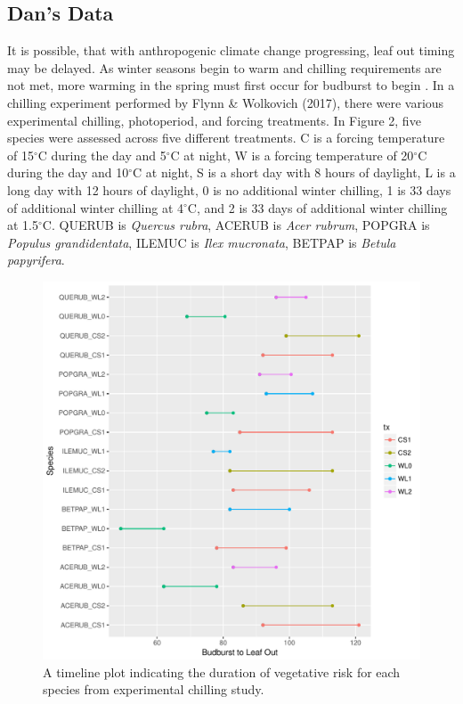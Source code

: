 \documentclass{article}\usepackage[]{graphicx}\usepackage[]{color}
\makeatletter
\def\maxwidth{ %
  \ifdim\Gin@nat@width>\linewidth
    \linewidth
  \else
    \Gin@nat@width
  \fi
}
\makeatother
\begin{document}
\subsection*{Dan's Data}
It is possible, that with anthropogenic climate change progressing, leaf out timing may be delayed. As winter seasons begin to warm and chilling requirements are not met, more warming in the spring must first occur for budburst to begin \citep{Chuine2010, Polgar2014, Fu2012, Morin2009, McCreary1990}. In a chilling experiment performed by Flynn \& Wolkovich (2017), there were various experimental chilling, photoperiod, and forcing treatments. In Figure 2, five species were assessed across five different treatments. C is a forcing temperature of 15$^{\circ}$C during the day and 5$^{\circ}$C at night, W is a forcing temperature of 20$^{\circ}$C during the day and 10$^{\circ}$C at night, S is a short day with 8 hours of daylight, L is a long day with 12 hours of daylight, 0 is no additional winter chilling, 1 is 33 days of additional winter chilling at 4$^{\circ}$C, and 2 is 33 days of additional winter chilling at 1.5$^{\circ}$C. QUERUB is \textit{Quercus rubra}, ACERUB is \textit{Acer rubrum}, POPGRA is \textit{Populus grandidentata}, ILEMUC is \textit{Ilex mucronata}, BETPAP is \textit{Betula papyrifera}.

\begin{figure}[H]
\includegraphics[width=\maxwidth]{figure/chilling-1} \caption[A timeline plot indicating the duration of vegetative risk for each species from experimental chilling study]{A timeline plot indicating the duration of vegetative risk for each species from experimental chilling study.}\label{fig:chilling}
\end{figure}
\end{document}
